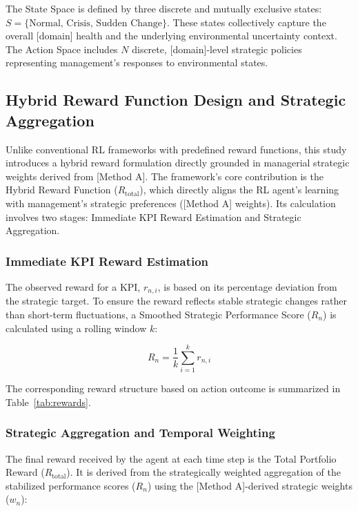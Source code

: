 \documentclass[10pt,twocolumn]{article}
\begin{document}
The State Space is defined by three discrete and mutually
exclusive states: $S = \{\text{Normal},\, \text{Crisis},\,
\text{Sudden Change}\}$. These states collectively capture the
overall [domain] health and the underlying environmental
uncertainty context. The Action Space includes $N$ discrete,
[domain]-level strategic policies representing management's
responses to environmental states.

\subsection{Hybrid Reward Function Design and Strategic
Aggregation}

Unlike conventional RL frameworks with predefined reward
functions, this study introduces a hybrid reward formulation
directly grounded in managerial strategic weights derived from
[Method A]. The framework's core contribution is the Hybrid
Reward Function ($R_{\mathrm{total}}$), which directly aligns the RL
agent's learning with management's strategic preferences ([Method
A] weights). Its calculation involves two stages: Immediate KPI
Reward Estimation and Strategic Aggregation.

\subsubsection{Immediate KPI Reward Estimation}
The observed reward for a KPI, $r_{n,i}$, is based on its
percentage deviation from the strategic target. To ensure the
reward reflects stable strategic changes rather than short-term
fluctuations, a Smoothed Strategic Performance Score ($R_n$) is
calculated using a rolling window $k$:

\begin{equation}
  R_n = \frac{1}{k} \sum_{i=1}^{k} r_{n,i}
  \label{eq:smoothed}
\end{equation}

The corresponding reward structure based on action outcome is
summarized in Table~\ref{tab:rewards}.

\subsubsection{Strategic Aggregation and Temporal Weighting}
The final reward received by the agent at each time step is the
Total Portfolio Reward ($R_{\mathrm{total}}$). It is derived from
the strategically weighted aggregation of the stabilized
performance scores ($R_n$) using the [Method A]-derived strategic
weights ($w_n$):
\end{document}
